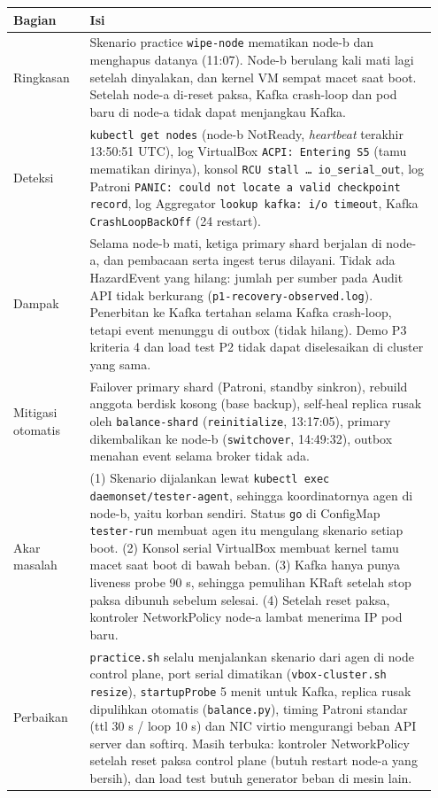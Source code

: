 {\small
\begin{longtable}{@{}>{\raggedright\arraybackslash}p{0.174\linewidth}>{\raggedright\arraybackslash}p{0.772\linewidth}@{}}
\toprule
\textbf{Bagian} & \textbf{Isi} \\
\midrule
\endhead
Ringkasan & Skenario practice \texttt{wipe-\allowbreak{}node} mematikan node-b dan menghapus datanya (11:07). Node-b berulang kali mati lagi setelah dinyalakan, dan kernel VM sempat macet saat boot. Setelah node-a di-reset paksa, Kafka crash-loop dan pod baru di node-a tidak dapat menjangkau Kafka. \\
Deteksi & \texttt{kubectl get nodes} (node-b NotReady, \emph{heartbeat} terakhir 13:50:51 UTC), log VirtualBox \texttt{ACPI: Entering S5} (tamu mematikan dirinya), konsol \texttt{RCU stall \ldots{} io\_\allowbreak{}serial\_\allowbreak{}out}, log Patroni \texttt{PANIC: could not locate a valid checkpoint record}, log Aggregator \texttt{lookup kafka: i/\allowbreak{}o timeout}, Kafka \texttt{Crash\allowbreak{}Loop\allowbreak{}Back\allowbreak{}Off} (24 restart). \\
Dampak & Selama node-b mati, ketiga primary shard berjalan di node-a, dan pembacaan serta ingest terus dilayani. Tidak ada HazardEvent yang hilang: jumlah per sumber pada Audit API tidak berkurang (\texttt{p1-\allowbreak{}recovery-\allowbreak{}observed.\allowbreak{}log}). Penerbitan ke Kafka tertahan selama Kafka crash-loop, tetapi event menunggu di outbox (tidak hilang). Demo P3 kriteria 4 dan load test P2 tidak dapat diselesaikan di cluster yang sama. \\
Mitigasi otomatis & Failover primary shard (Patroni, standby sinkron), rebuild anggota berdisk kosong (base backup), self-heal replica rusak oleh \texttt{balance-\allowbreak{}shard} (\texttt{reinitialize}, 13:17:05), primary dikembalikan ke node-b (\texttt{switchover}, 14:49:32), outbox menahan event selama broker tidak ada. \\
Akar masalah & (1) Skenario dijalankan lewat \texttt{kubectl exec daemonset/\allowbreak{}tester-\allowbreak{}agent}, sehingga koordinatornya agen di node-b, yaitu korban sendiri. Status \texttt{go} di ConfigMap \texttt{tester-\allowbreak{}run} membuat agen itu mengulang skenario setiap boot. (2) Konsol serial VirtualBox membuat kernel tamu macet saat boot di bawah beban. (3) Kafka hanya punya liveness probe 90 s, sehingga pemulihan KRaft setelah stop paksa dibunuh sebelum selesai. (4) Setelah reset paksa, kontroler NetworkPolicy node-a lambat menerima IP pod baru. \\
Perbaikan & \texttt{practice.\allowbreak{}sh} selalu menjalankan skenario dari agen di node control plane, port serial dimatikan (\texttt{vbox-\allowbreak{}cluster.\allowbreak{}sh resize}), \texttt{startup\allowbreak{}Probe} 5 menit untuk Kafka, replica rusak dipulihkan otomatis (\texttt{balance.\allowbreak{}py}), timing Patroni standar (ttl 30 s / loop 10 s) dan NIC virtio mengurangi beban API server dan softirq. Masih terbuka: kontroler NetworkPolicy setelah reset paksa control plane (butuh restart node-a yang bersih), dan load test butuh generator beban di mesin lain. \\
\bottomrule
\end{longtable}
}

